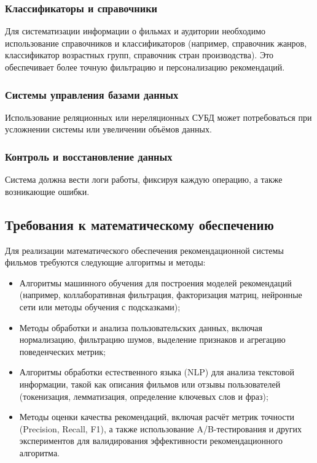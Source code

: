 \subsubsection{Классификаторы и справочники}

Для систематизации информации о фильмах и аудитории необходимо использование
справочников и классификаторов (например, справочник жанров, классификатор возрастных групп,
справочник стран производства). Это обеспечивает более точную фильтрацию и персонализацию рекомендаций.

\subsubsection{Системы управления базами данных}

Использование реляционных или нереляционных СУБД может потребоваться
при усложнении системы или увеличении объёмов данных.


\subsubsection{Контроль и восстановление данных}

Система должна вести логи работы, фиксируя каждую операцию, а также возникающие ошибки.

\subsection{Требования к математическому обеспечению}

Для реализации математического обеспечения рекомендационной системы фильмов
требуются следующие алгоритмы и методы:

\begin{itemize}
	\item Алгоритмы машинного обучения для построения моделей рекомендаций
	(например, коллаборативная фильтрация, факторизация матриц,
	нейронные сети или методы обучения с подсказками);
	\item Методы обработки и анализа пользовательских данных, включая нормализацию,
	фильтрацию шумов, выделение признаков и агрегацию поведенческих метрик;
	\item Алгоритмы обработки естественного языка (NLP) для анализа текстовой информации,
	такой как описания фильмов или отзывы пользователей
	(токенизация, лемматизация, определение ключевых слов и фраз);
	\item Методы оценки качества рекомендаций, включая расчёт метрик точности (Precision, Recall, F1),
	а также использование A/B-тестирования и других экспериментов
	для валидирования эффективности рекомендационного алгоритма.
\end{itemize}

